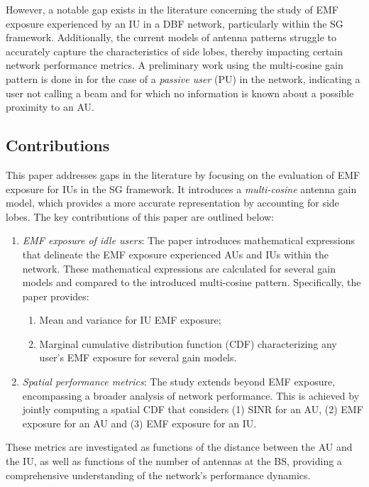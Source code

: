 However, a notable gap exists in the literature concerning the study of EMF exposure experienced by an IU in a DBF network, particularly within the SG framework. Additionally, the current models of antenna patterns struggle to accurately capture the characteristics of side lobes, thereby impacting certain network performance metrics. A preliminary work using the multi-cosine gain pattern is done in \cite{GontierMeta} for the case of a \textit{passive user} (PU) in the network, indicating a user not calling a beam and for which no information is known about a possible proximity to an AU.


\subsection{Contributions}
\label{ssec:contributions}
This paper addresses gaps in the literature by focusing on the evaluation of EMF exposure for IUs in the SG framework. It introduces a \textit{multi-cosine} antenna gain model, which provides a more accurate representation by accounting for side lobes. The key contributions of this paper are outlined below:
\begin{enumerate}
    \item \textit{EMF exposure of idle users}: The paper introduces mathematical expressions that delineate the EMF exposure experienced AUs and IUs within the network. These mathematical expressions are calculated for several gain models and compared to the introduced multi-cosine pattern. Specifically, the paper provides:
    \begin{enumerate}
        \item Mean and variance for IU EMF exposure;
        \item Marginal cumulative distribution function (CDF) characterizing any user's EMF exposure for several gain models.
    \end{enumerate}
    \item \textit{Spatial performance metrics}: The study extends beyond EMF exposure, encompassing a broader analysis of network performance. This is achieved by jointly computing a spatial CDF that considers (1) SINR for an AU, (2) EMF exposure for an AU and (3) EMF exposure for an IU.
\end{enumerate}
These metrics are investigated as functions of the distance between the AU and the IU, as well as functions of the number of antennas at the BS, providing a comprehensive understanding of the network's performance dynamics.

